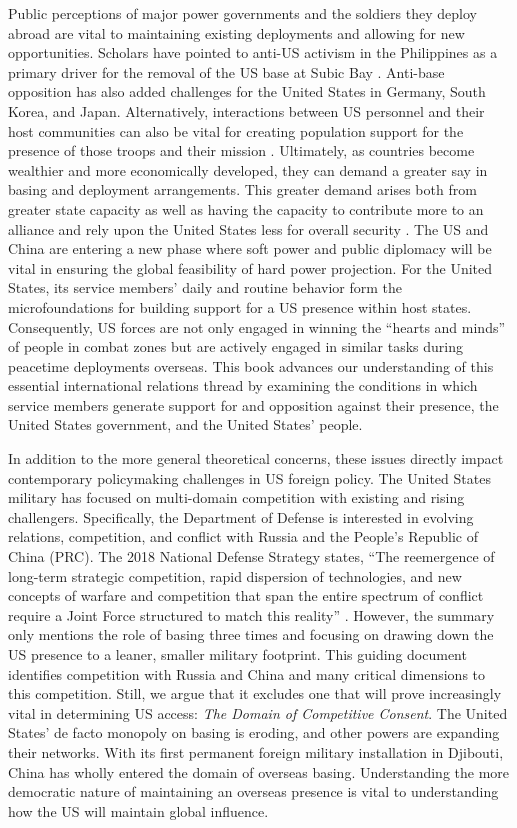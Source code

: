Public perceptions of major power governments and the soldiers they deploy abroad are vital to maintaining existing deployments and allowing for new opportunities. Scholars have pointed to anti-US activism in the Philippines as a primary driver for the removal of the US base at Subic Bay \cite{simbulan2009}. Anti-base opposition has also added challenges for the United States in Germany, South Korea, and Japan. Alternatively, interactions between US personnel and their host communities can also be vital for creating population support for the presence of those troops and their mission \cite{Allen2020}. Ultimately, as countries become wealthier and more economically developed, they can demand a greater say in basing and deployment arrangements. This greater demand arises both from greater state capacity as well as having the capacity to contribute more to an alliance and rely upon the United States less for overall security \cite{Lake2009a}.  The US and China are entering a new phase where soft power and public diplomacy will be vital in ensuring the global feasibility of hard power projection. For the United States, its service members' daily and routine behavior form the microfoundations for building support for a US presence within host states. Consequently, US forces are not only engaged in winning the ``hearts and minds'' of people in combat zones but are actively engaged in similar tasks during peacetime deployments overseas. This book advances our understanding of this essential international relations thread by examining the conditions in which service members generate support for and opposition against their presence, the United States government, and the United States' people.  

In addition to the more general theoretical concerns, these issues directly impact contemporary policymaking challenges in US foreign policy. The United States military has focused on multi-domain competition with existing and rising challengers. Specifically, the Department of Defense is interested in evolving relations, competition, and conflict with Russia and the People's Republic of China (PRC). The 2018 National Defense Strategy states, ``The reemergence of long-term strategic competition, rapid dispersion of technologies, and new concepts of warfare and competition that span the entire spectrum of conflict require a Joint Force structured to match this reality'' \citeyear[p. 1]{Mattis2018}. However, the summary only mentions the role of basing three times and focusing on drawing down the US presence to a leaner, smaller military footprint. This guiding document identifies competition with Russia and China and many critical dimensions to this competition. Still, we argue that it excludes one that will prove increasingly vital in determining US access: \textit{The Domain of Competitive Consent}. The United States' de facto monopoly on basing is eroding, and other powers are expanding their networks. With its first permanent foreign military installation in Djibouti, China has wholly entered the domain of overseas basing. Understanding the more democratic nature of maintaining an overseas presence is vital to understanding how the US will maintain global influence.

